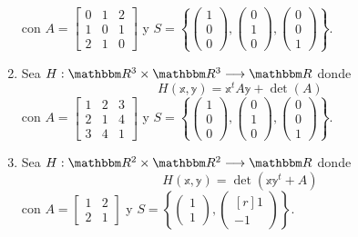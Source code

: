 \begin{enumerate}[resume]
    con $A = \begin{bmatrix} 0 & 1 & 2 \\ 1 & 0 & 1 \\ 2 & 1 & 0 \end{bmatrix}$ y $S = \left\{ \begin{pmatrix} 1 \\ 0 \\ 0 \end{pmatrix}, \begin{pmatrix} 0 \\ 1 \\ 0 \end{pmatrix}, \begin{pmatrix} 0 \\ 0 \\ 1 \end{pmatrix} \right\}$.
    \item Sea $H:\RR[3] \times \RR[3] \longrightarrow \RR$ donde
    $$H(\mathbb{x}, \mathbb{y}) = \mathbb{x}^t A\mathbb{y} + \operatorname{det}(A)$$
    con $A = \begin{bmatrix} 1 & 2 & 3 \\ 2 & 1 & 4 \\ 3 & 4 & 1 \end{bmatrix}$ y $S = \left\{ \begin{pmatrix} 1 \\ 0 \\ 0 \end{pmatrix}, \begin{pmatrix} 0 \\ 1 \\ 0 \end{pmatrix}, \begin{pmatrix} 0 \\ 0 \\ 1 \end{pmatrix} \right\}$.
    \item Sea $H:\RR[2] \times \RR[2] \longrightarrow \RR$ donde
    $$H(\mathbb{x}, \mathbb{y}) = \operatorname{det}(\mathbb{x}\mathbb{y}^t + A)$$
    con $A = \begin{bmatrix} 1 & 2 \\ 2 & 1 \end{bmatrix}$ y $S = \left\{ \begin{pmatrix} 1 \\ 1 \end{pmatrix}, \begin{pmatrix*}[r] 1 \\ -1 \end{pmatrix*} \right\}$.

\end{enumerate}
